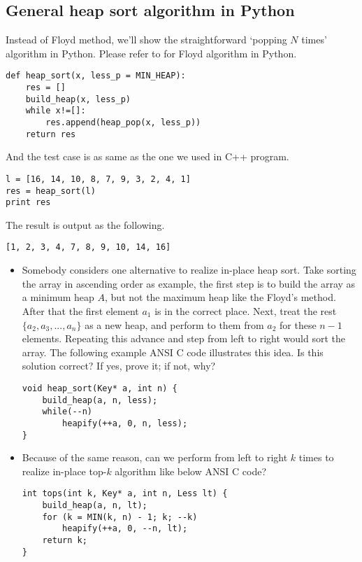 \documentclass{article}
\begin{document}
\subsection*{General heap sort algorithm in Python}

Instead of Floyd method, we'll show the straightforward
`popping $N$ times' algorithm in Python. Please refer
to \cite{rosetta-heapsort} for Floyd algorithm in Python.

\lstset{language=Python}
\begin{lstlisting}
def heap_sort(x, less_p = MIN_HEAP):
    res = []
    build_heap(x, less_p)
    while x!=[]:
        res.append(heap_pop(x, less_p))
    return res
\end{lstlisting}

And the test case is as same as the one we used in C++ program.

\begin{lstlisting}
l = [16, 14, 10, 8, 7, 9, 3, 2, 4, 1]
res = heap_sort(l)
print res
\end{lstlisting}

The result is output as the following.

\begin{verbatim}
[1, 2, 3, 4, 7, 8, 9, 10, 14, 16]
\end{verbatim}

\begin{Exercise}
\begin{itemize}
\item Somebody considers one alternative to realize in-place heap sort. Take
sorting the array in ascending order as example, the first step is to build
the array as a minimum heap $A$, but not the maximum heap like the Floyd's method.
After that the first element $a_1$ is in the correct place. Next, treat
the rest $\{a_2, a_3, ..., a_n\}$ as a new heap, and perform
 to them from $a_2$ for these $n-1$ elements. Repeating this
advance and  step from left to right would sort the array.
The following example ANSI C code illustrates this idea.
Is this solution correct? If yes, prove it; if not, why?
\lstset{language=C}
\begin{lstlisting}
void heap_sort(Key* a, int n) {
    build_heap(a, n, less);
    while(--n)
        heapify(++a, 0, n, less);
}
\end{lstlisting}

\item Because of the same reason, can we perform  from
left to right $k$ times to realize in-place top-$k$ algorithm like below
ANSI C code?
\lstset{language=C}
\begin{lstlisting}
int tops(int k, Key* a, int n, Less lt) {
    build_heap(a, n, lt);
    for (k = MIN(k, n) - 1; k; --k)
        heapify(++a, 0, --n, lt);
    return k;
}
\end{lstlisting}
\end{itemize}
\end{Exercise}
\end{document}
